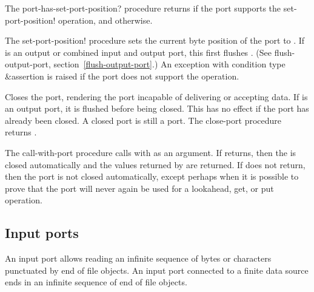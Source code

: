 \begin{entry}{%
}

   
The {\cf port-has-set-port-position?} procedure returns \schtrue{} if the port
supports the {\cf set-port-position!} operation, and \schfalse{}
otherwise.
   
The {\cf set-port-position!} procedure sets the current byte position
of the port to .  If  is an output or combined
input and output port, this first flushes .  (See {\cf
  flush-output-port}, section~\ref{flush-output-port}.)
An exception with condition type {\cf\&assertion} is raised
if the port does not support the operation.
\end{entry}

\begin{entry}{%
}
   
Closes the port, rendering the port incapable of delivering or
accepting data. If  is an output port, it is flushed before
being closed.  This has no effect if the port has already been closed.
A closed port is still a port.  The {\cf close-port} procedure returns
\unspecifiedreturn.
\end{entry}

\begin{entry}{%
}
   
  The {\cf call-with-port} procedure
calls  with  as an argument. If
 returns, then the  is closed automatically and
the values returned by  are returned. If  does not
return, then the port is not closed automatically, except perhaps when it is
possible to prove that the port will never again be used for a
{\cf lookahead}, {\cf get}, or {\cf put} operation.
\end{entry}

\subsection{Input ports}

An input port allows reading an infinite sequence of bytes
or characters punctuated
by end of file objects. An input port connected to a finite data
source ends in an infinite sequence of end of file objects.

